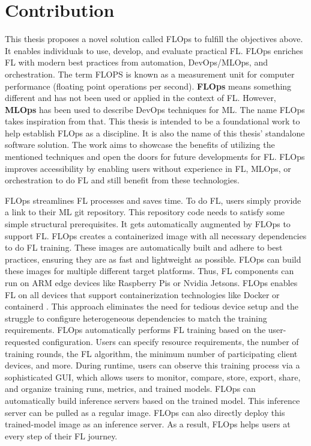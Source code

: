\section{Contribution}\label{section:contributions}

This thesis proposes a novel solution called FLOps to fulfill the objectives above.
It enables individuals to use, develop, and evaluate practical FL.
FLOps enriches FL with modern best practices from automation, DevOps/MLOps, and orchestration.
The term FLOPS is known as a measurement unit for computer performance (floating point operations per second).
\textbf{FLOps} means something different and has not been used or applied in the context of FL.
However, \textbf{MLOps} has been used to describe DevOps techniques for ML.
The name FLOps takes inspiration from that.
This thesis is intended to be a foundational work to help establish FLOps as a discipline.
It is also the name of this thesis' standalone software solution.
The work aims to showcase the benefits of utilizing the mentioned techniques and open the doors for future developments for FL.
FLOps improves accessibility by enabling users without experience in FL, MLOps, or orchestration to do FL and still benefit from these technologies.

FLOps streamlines FL processes and saves time.
To do FL, users simply provide a link to their ML git repository.
This repository code needs to satisfy some simple structural prerequisites.
It gets automatically augmented by FLOps to support FL.
FLOps creates a containerized image with all necessary dependencies to do FL training.
These images are automatically built and adhere to best practices, ensuring they are as fast and lightweight as possible.
FLOps can build these images for multiple different target platforms.
Thus, FL components can run on ARM edge devices like Raspberry Pis or Nvidia Jetsons.
FLOps enables FL on all devices that support containerization technologies like Docker or containerd \cite{containerd_docs}.
This approach eliminates the need for tedious device setup and the struggle to configure heterogeneous dependencies to match the training requirements.
FLOps automatically performs FL training based on the user-requested configuration.
Users can specify resource requirements, the number of training rounds, the FL algorithm, the minimum number of participating client devices, and more.
During runtime, users can observe this training process via a sophisticated GUI, which allows users to monitor, compare, store, export, share, and organize training runs, metrics, and trained models.
FLOps can automatically build inference servers based on the trained model.
This inference server can be pulled as a regular image.
FLOps can also directly deploy this trained-model image as an inference server.
As a result, FLOps helps users at every step of their FL journey.

